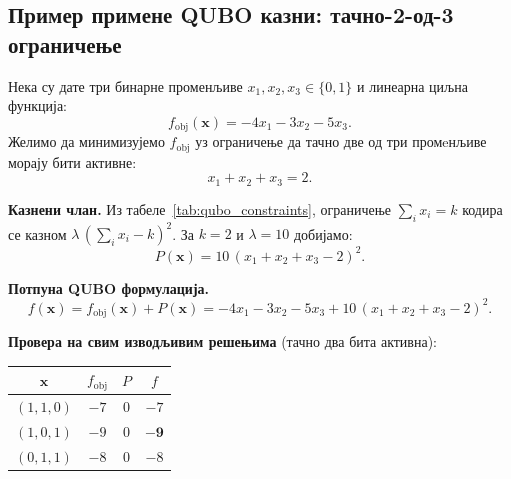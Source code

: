 \begin{table}[ht]
\centering
\caption{Стандардна ограничења и њихове QUBO казне ($\lambda > 0$).}
\label{tab:qubo_constraints}
\renewcommand{\arraystretch}{1.6}
\end{table}

\subsection{Пример примене QUBO казни: тачно-2-од-3 ограничење}

Нека су дате три бинарне променљиве $x_1, x_2, x_3 \in \{0,1\}$ и
линеарна циљна функција:
\[
  f_{\mathrm{obj}}(\mathbf{x}) = -4x_1 - 3x_2 - 5x_3.
\]
Желимо да минимизујемо $f_{\mathrm{obj}}$ уз ограничење да тачно две
од три промeнљиве морају бити активне:
\[
  x_1 + x_2 + x_3 = 2.
\]

\textbf{Казнени члан.}
Из табеле~\ref{tab:qubo_constraints}, ограничење $\sum_i x_i = k$
кодира се казном $\lambda\,(\sum_i x_i - k)^2$.
За $k = 2$ и $\lambda = 10$ добијамо:
\[
  P(\mathbf{x}) = 10\,(x_1 + x_2 + x_3 - 2)^2.
\]

\textbf{Потпуна QUBO формулација.}
\[
  f(\mathbf{x}) = f_{\mathrm{obj}}(\mathbf{x}) + P(\mathbf{x})
  = -4x_1 - 3x_2 - 5x_3 + 10\,(x_1 + x_2 + x_3 - 2)^2.
\]

\textbf{Провера на свим изводљивим решењима} (тачно два бита активна):
\begin{center}
\renewcommand{\arraystretch}{1.3}
\begin{tabular}{|c|c|c|c|}
\hline
$\mathbf{x}$ & $f_{\mathrm{obj}}$ & $P$ & $f$ \\
\hline
$(1,1,0)$ & $-7$ & $0$ & $-7$ \\
$(1,0,1)$ & $-9$ & $0$ & $\mathbf{-9}$ \\
$(0,1,1)$ & $-8$ & $0$ & $-8$ \\
\hline
\end{tabular}
\end{center}

